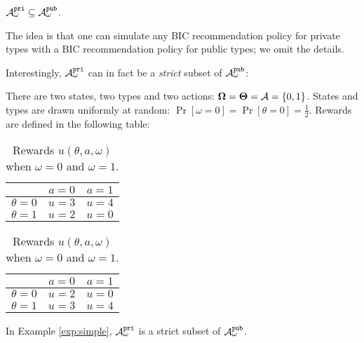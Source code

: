 
\begin{claim}
$\mathcal{A}_{\omega}^{\mathtt{pri}} \subseteq \mathcal{A}_{\omega}^{\mathtt{pub}}$.
\end{claim}

The idea is that one can simulate any BIC recommendation policy for private types with a BIC recommendation policy for public types; we omit the details.


Interestingly, $\mathcal{A}_{\omega}^{\mathtt{pri}}$ can in fact be a {\em strict} subset of $\mathcal{A}_{\omega}^{\mathtt{pub}}$:

\begin{example}
	\label{exp:simple}
	There are two states, two types and two actions:
	$\bold{\Omega} = \bold{\Theta} = \mathcal{A} = \{0,1\}$.
	States and types are drawn uniformly at random:
	$\Pr[\omega =0] =\Pr[\theta =0] = \tfrac12$.
	Rewards are defined in the following table:\\
	\begin{table}[H]
		\centering
		\begin{tabular}{|c||c|c|}
			\hline
			&$a=0$&$a=1$\\
			\hline
			\hline
			$\theta = 0$& $u = 3$ & $u =4$\\
			\hline
			$\theta = 1$& $u = 2$ & $u =0$\\
			\hline
		\end{tabular}
		\quad
		\begin{tabular}{|c||c|c|}
			\hline
			&$a=0$&$a=1$\\
			\hline
			\hline
			$\theta = 0$& $u = 2$ & $u =0$\\
			\hline
			$\theta = 1$& $u = 3$ & $u =4$\\
			\hline
		\end{tabular}
		\caption{Rewards $u(\theta,a,\omega)$ when $\omega =0 $ and $\omega = 1$.}
	\end{table}
\end{example}

\begin{claim}
	In Example \ref{exp:simple}, $\mathcal{A}_{\omega}^{\mathtt{pri}}$ is a strict subset of $\mathcal{A}_{\omega}^{\mathtt{pub}}$.
\end{claim}

